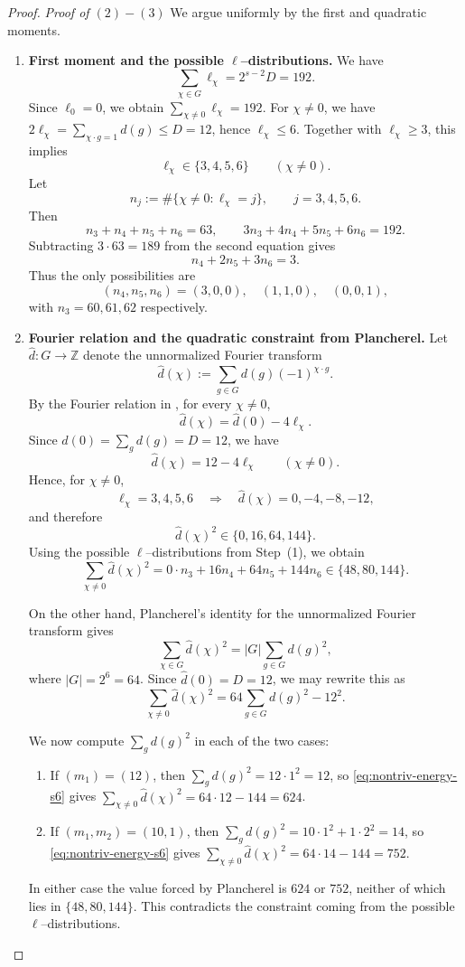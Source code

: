 \documentclass[10pt,a4paper]{amsart}
\begin{document}
\begin{proof}
\noindent\textit{Proof of $(2)-(3)$}
We argue uniformly by the first and quadratic moments.

\begin{enumerate}
\item \textbf{First moment and the possible $\ell$--distributions.}
We have
\[
\sum_{\chi\in G}\ell_\chi = 2^{s-2}D = 192.
\]
Since $\ell_0=0$, we obtain $\sum_{\chi\neq 0}\ell_\chi=192$.
For $\chi\neq 0$, we have $2\ell_\chi=\sum_{\chi\cdot g=1} d(g)\le D=12$, hence
$\ell_\chi\le 6$. Together with $\ell_\chi\ge 3$, this implies
\[
\ell_\chi\in\{3,4,5,6\}\qquad(\chi\neq 0).
\]
Let
\[
n_j:=\#\{\chi\neq 0:\ell_\chi=j\},\qquad j=3,4,5,6.
\]
Then
\[
n_3+n_4+n_5+n_6=63,
\qquad
3n_3+4n_4+5n_5+6n_6=192.
\]
Subtracting $3\cdot 63=189$ from the second equation gives
\[
n_4+2n_5+3n_6=3.
\]
Thus the only possibilities are
\[
(n_4,n_5,n_6)=(3,0,0),\quad (1,1,0),\quad (0,0,1),
\]
with $n_3=60,61,62$ respectively.

\item \textbf{Fourier relation and the quadratic constraint from Plancherel.}
Let $\widehat d:G\to\mathbb Z$ denote the unnormalized Fourier transform
\[
\widehat d(\chi):=\sum_{g\in G} d(g)(-1)^{\chi\cdot g}.
\]
By the Fourier relation in , for every $\chi\neq 0$,
\[
\widehat d(\chi)=\widehat d(0)-4\ell_\chi.
\]
Since $\widehat d(0)=\sum_g d(g)=D=12$, we have
\[
\widehat d(\chi)=12-4\ell_\chi
\qquad (\chi\neq 0).
\]
Hence, for $\chi\neq 0$,
\[
\ell_\chi=3,4,5,6 \quad\Longrightarrow\quad
\widehat d(\chi)=0,-4,-8,-12,
\]
and therefore
\[
\widehat d(\chi)^2\in\{0,16,64,144\}.
\]
Using the possible $\ell$--distributions from Step~(1), we obtain
\[
\sum_{\chi\neq 0}\widehat d(\chi)^2
=
0\cdot n_3 + 16n_4 + 64n_5 + 144n_6
\in\{48,80,144\}.
\]

On the other hand, Plancherel's identity for the unnormalized Fourier transform gives
\[
\sum_{\chi\in G}\widehat d(\chi)^2
=
|G|\sum_{g\in G} d(g)^2,
\]
where $|G|=2^6=64$. Since $\widehat d(0)=D=12$, we may rewrite this as
\begin{equation}\label{eq:nontriv-energy-s6}
\sum_{\chi\neq 0}\widehat d(\chi)^2
=
64\sum_{g\in G} d(g)^2 - 12^2.
\end{equation}

We now compute $\sum_g d(g)^2$ in each of the two cases:

\begin{enumerate}
\item If $(m_1)=(12)$, then $\sum_g d(g)^2 = 12\cdot 1^2 = 12$,
so \eqref{eq:nontriv-energy-s6} gives $\sum_{\chi\neq 0}\widehat d(\chi)^2=64\cdot12-144=624$.
\item If $(m_1,m_2)=(10,1)$, then $\sum_g d(g)^2 = 10\cdot 1^2 + 1\cdot 2^2=14$,
so \eqref{eq:nontriv-energy-s6} gives $\sum_{\chi\neq 0}\widehat d(\chi)^2=64\cdot14-144=752$.
\end{enumerate}
In either case the value forced by Plancherel is $624$ or $752$, neither of which lies
in $\{48,80,144\}$. This contradicts the constraint coming from the possible
$\ell$--distributions.


\end{enumerate}
\end{proof}
\end{document}
